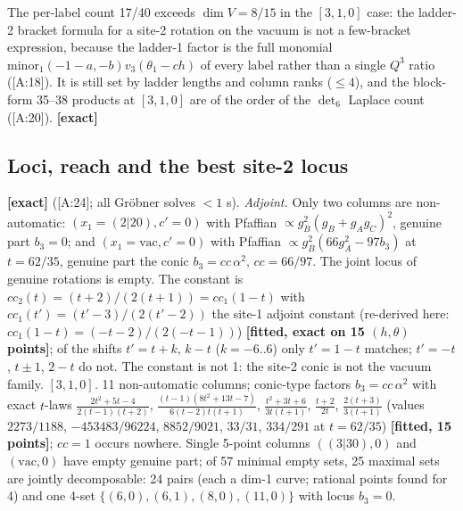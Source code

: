 \documentclass[10pt]{article}
\newcommand{\cl}[2]{\textsf{[#1:#2]}}
\newcommand{\tg}[1]{\textbf{[#1]}}
\newcommand{\vac}{\mathrm{vac}}
\begin{document}
The per-label count 17/40 exceeds $\dim V=8/15$ in the $[3,1,0]$ case: the ladder-2 bracket formula for a site-2 rotation on the vacuum is not a few-bracket expression, because the ladder-1 factor is the full monomial $\mathrm{minor}_1(-1-a,-b)v_3(\theta_1-ch)$ of every label rather than a single $Q^3$ ratio (\cl{A}{18}). It is still set by ladder lengths and column ranks ($\le4$), and the block-form 35--38 products at $[3,1,0]$ are of the order of the $\det_6$ Laplace count (\cl{A}{20}). \tg{exact}

\subsection{Loci, reach and the best site-2 locus}\label{sec:Aloci}

\tg{exact} (\cl{A}{24}; all Gr\"obner solves $<1$ s). \emph{Adjoint.} Only two columns are non-automatic: $(x_1=(2|20),c'=0)$ with Pfaffian $\propto g_B^2(g_B+g_Ag_C)^2$, genuine part $b_3=0$; and $(x_1=\vac,c'=0)$ with Pfaffian $\propto g_B^2(66g_A^2-97b_3)$ at $t=62/35$, genuine part the conic $b_3=cc\,\alpha^2$, $cc=66/97$. The joint locus of genuine rotations is empty. The constant is $cc_2(t)=(t+2)/(2(t+1))=cc_1(1-t)$ with $cc_1(t')=(t'-3)/(2(t'-2))$ the site-1 adjoint constant (re-derived here: $cc_1(1-t)=(-t-2)/(2(-t-1))$) \tg{fitted, exact on 15 $(h,\theta)$ points}; of the shifts $t'=t+k$, $k-t$ ($k=-6..6$) only $t'=1-t$ matches; $t'=-t$, $t\pm1$, $2-t$ do not. The constant is not 1: the site-2 conic is not the vacuum family. \emph{$[3,1,0]$.} 11 non-automatic columns; conic-type factors $b_3=cc\,\alpha^2$ with exact $t$-laws $\frac{2t^2+5t-4}{2(t-1)(t+2)}$, $\frac{(t-1)(8t^2+13t-7)}{6(t-2)t(t+1)}$, $\frac{t^2+3t+6}{3t(t+1)}$, $\frac{t+2}{2t}$, $\frac{2(t+3)}{3(t+1)}$ (values $2273/1188$, $-453483/96224$, $8852/9021$, $33/31$, $334/291$ at $t=62/35$) \tg{fitted, 15 points}; $cc=1$ occurs nowhere. Single 5-point columns $((3|30),0)$ and $(\vac,0)$ have empty genuine part; of 57 minimal empty sets, 25 maximal sets are jointly decomposable: 24 pairs (each a dim-1 curve; rational points found for 4) and one 4-set $\{(6,0),(6,1),(8,0),(11,0)\}$ with locus $b_3=0$.
\end{document}
